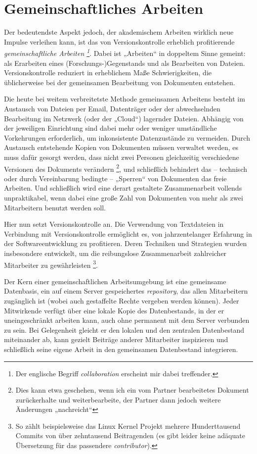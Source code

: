 \documentclass[DIV=12]{scrreprt}
\begin{document}
\section{Gemeinschaftliches Arbeiten}
\label{sec:pt_collaborative-editing}

Der bedeutendste Aspekt jedoch, der akademischem Arbeiten wirklich neue Impulse verleihen kann, ist das von Versionskontrolle erheblich profitierende \emph{gemeinschaftliche Arbeiten%
\footnote{Der englische Begriff \emph{collaboration} erscheint mir dabei treffender.}}.
Dabei ist „Arbeiten“ in doppeltem Sinne gemeint: als Erarbeiten eines (Forschungs-)Gegenstands und als Bearbeiten von Dateien.
Versionskontrolle reduziert in erheblichem Maße Schwierigkeiten, die üblicherweise bei der gemeinsamen Bearbeitung von Dokumenten entstehen.

Die heute bei weitem verbreitetste Methode gemeinsamen Arbeitens besteht im Austausch von Dateien per Email, Datenträger oder der abwechselnden Bearbeitung im Netzwerk (oder der „Cloud“) lagernder Dateien.
Abhängig von der jeweiligen Einrichtung sind dabei mehr oder weniger umständliche Vorkehrungen erforderlich, um inkonsistente Datenzustände zu vermeiden.
Durch Austausch entstehende Kopien von Dokumenten müssen verwaltet werden, es muss dafür gesorgt werden, dass nicht zwei Personen gleichzeitig verschiedene Versionen des Dokuments verändern%
\footnote{Dies kann etwa geschehen, wenn ich ein vom Partner bearbeitetes Dokument zurückerhalte und weiterbearbeite, der Partner dann jedoch weitere Änderungen „nachreicht“},
und schließlich behindert das -- technisch oder durch Vereinbarung bedingte -- „Sperren“ von Dokumenten das freie Arbeiten.
Und schließlich wird eine derart gestaltete Zusammenarbeit vollends unpraktikabel, wenn dabei eine große Zahl von Dokumenten von mehr als zwei Mitarbeitern benutzt werden soll.

Hier nun setzt Versionskontrolle an.
Die Verwendung von Textdateien in Verbindung mit Versionskontrolle ermöglicht es, von jahrzentelanger Erfahrung in der Softwareentwicklung zu profitieren.
Deren Techniken und Strategien wurden insbesondere entwickelt, um die reibungslose Zusammenarbeit zahlreicher Mitarbeiter zu gewährleisten%
\footnote{So zählt beispielsweise das Linux Kernel Projekt mehrere Hunderttausend Commits von über zehntausend Beitragenden (es gibt leider keine adäquate Übersetzung für das passendere \emph{contributor}).}.

Der Kern einer gemeinschaftlichen Arbeitsumgebung ist eine gemeinsame Datenbasis, ein auf einem Server gespeichertes \emph{repository}, das allen Mitarbeitern zugänglich ist (wobei auch gestaffelte Rechte vergeben werden können).
Jeder Mitwirkende verfügt über eine lokale Kopie des Datenbestands, in der er uneingeschränkt arbeiten kann, auch ohne permanent mit dem Server verbunden zu sein.
Bei Gelegenheit gleicht er den lokalen und den zentralen Datenbestand miteinander ab, kann gezielt Beiträge anderer Mitarbeiter inspizieren und schließlich seine eigene Arbeit in den gemeinsamen Datenbestand integrieren.
\end{document}
